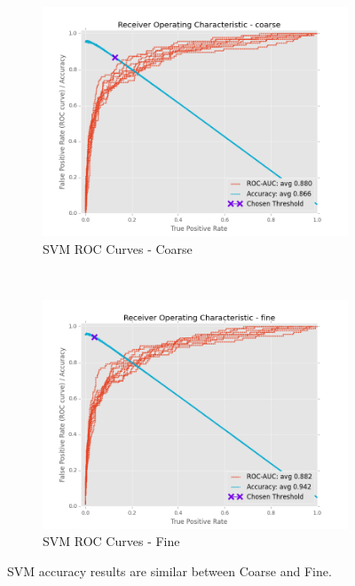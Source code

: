 \documentclass[ms]{nuthesis}
\begin{document}
\FloatBarrier
\begin{figure}[!htb]
    \centering
    \begin{subfigure}[t]{0.5\textwidth}
        \centering
        \includegraphics[width=\textwidth]{fig/SVM_FindThreshold_RocCurve_coarse}
        \caption{SVM ROC Curves - Coarse}
    \end{subfigure}%
    ~
    \begin{subfigure}[t]{0.5\textwidth}
        \centering
        \includegraphics[width=\textwidth]{fig/SVM_FindThreshold_RocCurve_fine}
        \caption{SVM ROC Curves - Fine}
    \end{subfigure}
    \caption{SVM accuracy results are similar between Coarse and Fine.}
    \label{fig:SVMThreshRoc}
\end{figure}
\FloatBarrier
\end{document}
